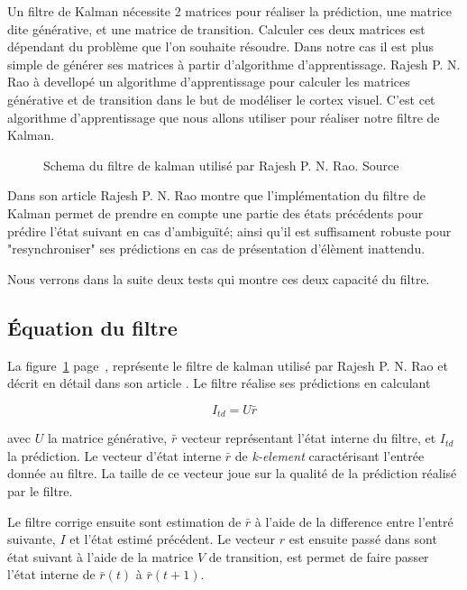 Un filtre de Kalman nécessite 2 matrices pour réaliser la prédiction, une
matrice dite générative, et une matrice de transition\cite{Rao1999}. Calculer
ces deux matrices est dépendant du problème que l'on souhaite résoudre. Dans
notre cas il est plus simple de générer ses matrices à partir d'algorithme
d'apprentissage. Rajesh P. N. Rao à devellopé un algorithme d'apprentissage
pour calculer les matrices générative et de transition dans le but de modéliser
le cortex visuel\cite{Rao1999}. C'est cet algorithme d'apprentissage que nous
allons utiliser pour réaliser notre filtre de Kalman.

\begin{figure}[ht]
   \begin{center}
   \end{center}
   \caption[Schema du filtre de kalman]{Schema du filtre de kalman utilisé par
   Rajesh P. N. Rao. Source \cite{Rao1999}}
   \label{fig:filtre_kalman}
\end{figure}

Dans son article\cite{Rao1999} Rajesh P. N. Rao montre que l'implémentation du
filtre de Kalman permet de prendre en compte une partie des états précédents
pour prédire l'état suivant en cas d'ambiguïté; ainsi qu'il est suffisament
robuste pour "resynchroniser" ses prédictions en cas de présentation d'élèment
inattendu.

Nous verrons dans la suite deux tests qui montre ces deux capacité du filtre.

\subsection{Équation du filtre} %
\label{sub:Équation du filtre}

La figure~\ref{fig:filtre_kalman} page~\pageref{fig:filtre_kalman}, représente
le filtre de kalman utilisé par Rajesh P. N. Rao et décrit en détail dans son
article \cite{Rao1999}. Le filtre réalise ses prédictions en calculant

\[ I_{td} = U\bar{r} \]

avec $U$ la matrice générative, $\bar{r}$ vecteur représentant l'état interne
du filtre, et $I_{td}$ la prédiction. Le vecteur d'état interne $\bar{r}$ de
\textit{k-element} caractérisant l'entrée donnée au filtre. La taille de ce
vecteur joue sur la qualité de la prédiction réalisé par le filtre.

Le filtre corrige ensuite sont estimation de $\bar{r}$ à l'aide de la
difference entre l'entré suivante, $I$ et l'état estimé précédent. Le vecteur
$r$ est ensuite passé dans sont état suivant à l'aide de la matrice $V$ de
transition, est permet de faire passer l'état interne de $\bar{r}(t)$ à
$\bar{r}(t+1)$.\\

